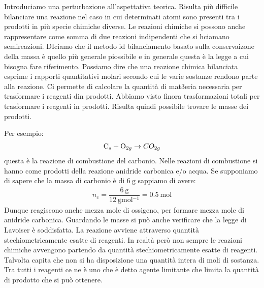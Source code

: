 \documentclass[../AppuntiChimica]{subfiles}
\begin{document}
	Introduciamo una perturbazione all'aspettativa teorica. Risulta più difficile bilanciare una reazione nel caso in cui determinati atomi sono presenti tra i prodotti in più specie chimiche diverse. Le reazioni chimiche si possono anche rappresentare come somma di due reazioni indipendenti che si hciamano semireazioni. DIciamo che il metodo id bilanciamento basato sulla conservaizone della massa è quello più generale piossibile e in generale questa è la legge a cui bisogna fare riferimento. Possiamo dire che una reazione chimica bilanciata esprime i rapporti quantitativi molari secondo cui le varie sostanze rendono parte alla reazione. Ci permette di calcolare la quantità di mat3eria necessaria per trasformare i reagenti din prodotti. Abbiamo visto finora trasformazioni totali per trasformare i reagenti in prodotti. Risulta quindi possibile trovare le masse dei prodotti.
	
	Per esempio:
	\begin{gather}
	\text{C}_{s}+\text{O}_{2g}\to
	CO_{2g}
	\end{gather}
	 questa è la reazione di combustione del carbonio. Nelle reazioni di combustione si hanno come prodotti della reazione anidride carbonica e/o acqua. Se supponiamo di sapere che la massa di carbonio è di $ \SI{6}{\gram} $ sappiamo di avere:
	 \begin{gather}
	 n_{c}=\dfrac{\SI{6}{\gram}}{\SI{12}{\gram\mole^{-1}}}=\SI{0.5}{\mole}
	 \end{gather}
	 Dunque reagiscono anche mezza mole di ossigeno, per formare mezza mole di anidride carbonica. Guardando le masse si può anche verificare che la legge di Lavoiser è soddisfatta. La reazione avviene attraverso quantità stechiometricamente esatte di reagenti. In realtà però non sempre le reazioni chimiche avvengono partendo da quantità stechiometricamente esatte di reagenti. Talvolta capita che non si ha  disposizione una quantità intera di moli di sostanza. Tra tutti i reagenti ce ne è uno che è detto agente limitante che limita la quantità di prodotto che si può ottenere.
	 
\end{document}
